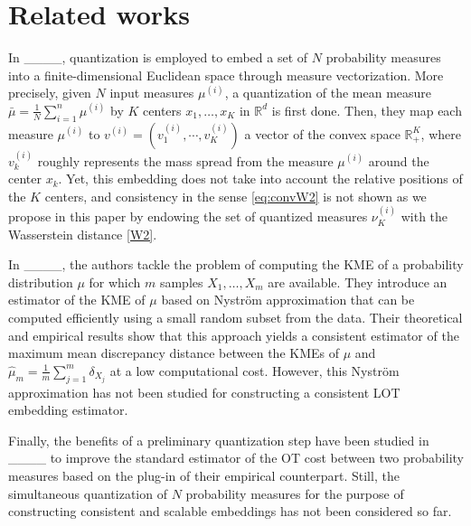 \section{Related works}
\label{sec:works}
 
 In ____,  quantization is employed to embed a set of $N$ probability measures into a finite-dimensional Euclidean space through measure vectorization. More precisely, given $N$ input measures $\mu^{(i)}$, a quantization of the mean measure $\bar{\mu} = \frac{1}{N}\sum_{i=1}^n \mu^{(i)}$ by $K$ centers $x_1,\ldots,x_K$  in  $\mathbb{R}^d$ is first done. Then, they map each measure $\mu^{(i)}$ to $v^{(i)}= (v^{(i)}_1,\cdots, v^{(i)}_K)$ a vector of the convex space $\mathbb{R}_{+}^K$, where $v^{(i)}_k$ roughly represents the mass spread from the measure $\mu^{(i)}$ around the center $x_k$.  %
 Yet, this embedding does not take into account the relative positions of the $K$ centers, and consistency in the sense \eqref{eq:convW2} is not shown as we propose in this paper by endowing the set of quantized measures $\nu^{(i)}_K$  with the Wasserstein distance \eqref{W2}.

 In ____, the authors tackle the problem of computing the KME of a probability distribution $\mu$ for which $m$ samples $X_1,\ldots,X_m$  are available. They introduce an estimator of the KME of $\mu$ based on Nystr\"om approximation that can be computed efficiently using a small random subset  from the data. Their theoretical and empirical results show that this approach yields a consistent estimator of the maximum mean discrepancy distance between the KMEs of $\mu$ and $\hat{\mu}_{m} = \frac{1}{m} \sum_{j= 1}^{m} \delta_{X_j}$ at a low computational cost. However, this Nystr\"om approximation has not been studied for constructing a consistent LOT embedding  estimator.

Finally, the benefits of a preliminary quantization step have been studied in ____ to improve  the standard estimator of the OT cost between two probability measures based on the plug-in of their empirical counterpart. Still, the simultaneous quantization of $N$ probability measures for the purpose of constructing consistent and scalable embeddings has not been considered so far.